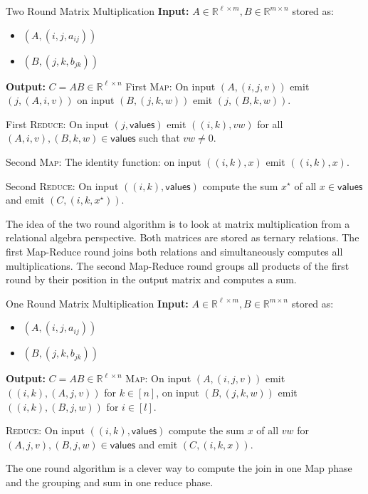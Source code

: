\documentclass[english]{panikzettel}
\begin{document}
\begin{algo}{Two Round Matrix Multiplication}
\textbf{Input:} $A \in \mathbb{R}^{\ell \times m}, B \in \mathbb{R}^{m \times n}$ stored as:
\begin{itemize}
	\item $(A,(i,j,a_{ij}))$
	\item $(B,(j,k,b_{jk}))$
\end{itemize}

\textbf{Output:} $C = AB \in \mathbb{R}^{\ell \times n}$
\tcblower
First \textsc{Map}: On input $(A,(i,j,v))$ emit $(j,(A,i,v))$ on input $(B,(j,k,w))$ emit $(j,(B,k,w))$.

First \textsc{Reduce}: On input $(j, \textsf{values})$ emit $((i,k),vw)$ for all $(A,i,v),(B,k,w) \in \textsf{values}$ such that $vw \neq 0$.

Second \textsc{Map}: The identity function: on input $((i,k),x)$ emit $((i,k),x)$.

Second \textsc{Reduce}: On input $((i,k), \textsf{values})$ compute the sum $x^\star$ of all $x \in \textsf{values}$ and emit $(C,(i,k,x^\star))$.
\end{algo}

The idea of the two round algorithm is to look at matrix multiplication from a relational algebra perspective.
Both matrices are stored as ternary relations.
The first Map-Reduce round joins both relations and simultaneously computes all multiplications.
The second Map-Reduce round groups all products of the first round by their position in the output matrix and computes a sum.

\begin{algo}{One Round Matrix Multiplication}
\textbf{Input:} $A \in \mathbb{R}^{\ell \times m}, B \in \mathbb{R}^{m \times n}$ stored as:
\begin{itemize}
	\item $(A,(i,j,a_{ij}))$
	\item $(B,(j,k,b_{jk}))$
\end{itemize}

\textbf{Output:} $C = AB \in \mathbb{R}^{\ell \times n}$
\tcblower
\textsc{Map}: On input $(A,(i,j,v))$ emit $((i,k),(A,j,v))$ for $k \in [n]$, on input $(B,(j,k,w))$ emit $((i,k),(B,j,w))$ for $i \in [l]$.

\textsc{Reduce}: On input $((i,k), \textsf{values})$ compute the sum $x$ of all $vw$ for $(A,j,v),(B,j,w) \in \textsf{values}$ and emit $(C,(i,k,x))$.
\end{algo}


The one round algorithm is a clever way to compute the join in one Map phase and the grouping and sum in one reduce phase.
\end{document}
